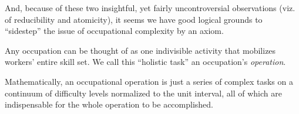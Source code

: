 \documentclass[hidelinks, nonatbib]{elsarticle}
\begin{document}
And, because of these two insightful, yet fairly uncontroversial observations (viz. of reducibility and atomicity), it seems we have good logical grounds to ``sidestep'' the issue of occupational complexity by an axiom.
\begin{axiom}
    \label{woca}
    Any occupation can be thought of as one indivisible activity that mobilizes workers' entire skill set. We call this ``holistic task'' an occupation's \textit{operation}.

    Mathematically, an occupational operation is just a series of complex tasks on a continuum of difficulty levels normalized to the unit interval, all of which are indispensable for the whole operation to be accomplished.
    

\end{axiom}
\end{document}
